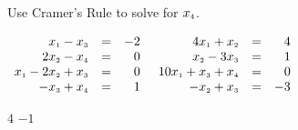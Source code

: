 
\begin{Exercise}[
name={},
title={}, 
difficulty=0,
origin={\cite{SZ}}]
Use Cramer's Rule to solve for $x_{\mbox{\tiny$4$}}$.
\begin{multicols}{2}
\Question $\begin{array}{rcr} x_{\mbox{\tiny$1$}} - x_{\mbox{\tiny$3$}} & = & -2 \\ 
2x_{\mbox{\tiny$2$}} - x_{\mbox{\tiny$4$}} & = & 0  \\  
x_{\mbox{\tiny$1$}} -  2x_{\mbox{\tiny$2$}} + x_{\mbox{\tiny$3$}} & = & 0 \\
-x_{\mbox{\tiny$3$}} + x_{\mbox{\tiny$4$}} & = & 1  \end{array}$ 
\Question $\begin{array}{rcr} 4x_{\mbox{\tiny$1$}} + x_{\mbox{\tiny$2$}} & = & 4 \\ 
x_{\mbox{\tiny$2$}} - 3x_{\mbox{\tiny$3$}} & = & 1  \\  
10x_{\mbox{\tiny$1$}} +x_{\mbox{\tiny$3$}} + x_{\mbox{\tiny$4$}} & = & 0 \\
-x_{\mbox{\tiny$2$}} + x_{\mbox{\tiny$3$}} & = & -3  \end{array}$ 
\EndCurrentQuestion
\end{multicols}
\end{Exercise}

\begin{Answer}
\Question $4$
\Question $-1$
\end{Answer}
